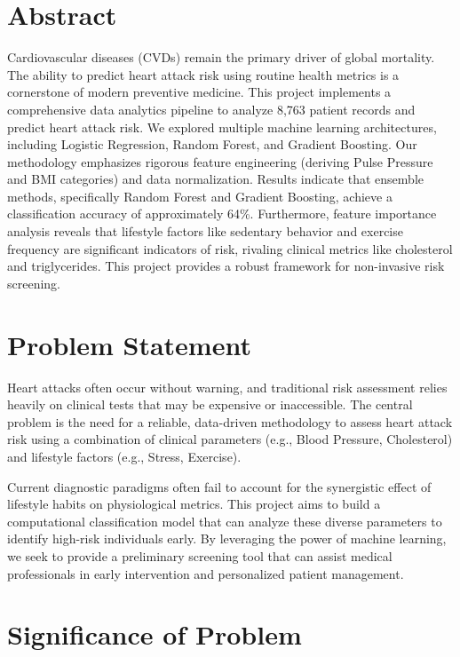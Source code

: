 \documentclass[12pt]{article}
\begin{document}
\section*{Abstract}
Cardiovascular diseases (CVDs) remain the primary driver of global mortality. The ability to predict heart attack risk using routine health metrics is a cornerstone of modern preventive medicine. This project implements a comprehensive data analytics pipeline to analyze 8,763 patient records and predict heart attack risk. We explored multiple machine learning architectures, including Logistic Regression, Random Forest, and Gradient Boosting. Our methodology emphasizes rigorous feature engineering (deriving Pulse Pressure and BMI categories) and data normalization. Results indicate that ensemble methods, specifically Random Forest and Gradient Boosting, achieve a classification accuracy of approximately 64\%. Furthermore, feature importance analysis reveals that lifestyle factors like sedentary behavior and exercise frequency are significant indicators of risk, rivaling clinical metrics like cholesterol and triglycerides. This project provides a robust framework for non-invasive risk screening.

\newpage
\tableofcontents
\newpage

\section{Problem Statement}
Heart attacks often occur without warning, and traditional risk assessment relies heavily on clinical tests that may be expensive or inaccessible. The central problem is the need for a reliable, data-driven methodology to assess heart attack risk using a combination of clinical parameters (e.g., Blood Pressure, Cholesterol) and lifestyle factors (e.g., Stress, Exercise). 

Current diagnostic paradigms often fail to account for the synergistic effect of lifestyle habits on physiological metrics. This project aims to build a computational classification model that can analyze these diverse parameters to identify high-risk individuals early. By leveraging the power of machine learning, we seek to provide a preliminary screening tool that can assist medical professionals in early intervention and personalized patient management.

\section{Significance of Problem}
\end{document}
